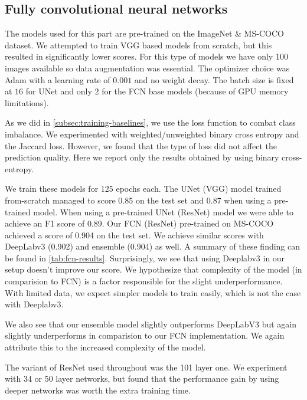 \subsection{Fully convolutional neural networks} \label{subsec:training-fcn}
The models used for this part are pre-trained on the ImageNet \& MS-COCO dataset. We attempted to train VGG based models from scratch, but this resulted in significantly lower scores. For this type of models we have only 100 images available so data augmentation was essential. The optimizer choice was Adam with a learning rate of $0.001$ and no weight decay. The batch size is fixed at $16$ for UNet and only $2$ for the FCN base models (because of GPU memory limitations).

As we did in \autoref{subsec:training-baselines}, we use the loss function to combat class imbalance. We experimented with weighted/unweighted binary cross entropy and the Jaccard loss. However, we found that the type of loss did not affect the prediction quality. Here we report only the results obtained by using binary cross-entropy.

We train these models for 125 epochs each. The UNet (VGG) model trained from-scratch managed to score 0.85 on the test set and 0.87 when using a pre-trained model. When using a pre-trained UNet (ResNet) model we were able to achieve an F1 score of 0.89. Our FCN (ResNet) pre-trained on MS-COCO achieved a score of 0.904 on the test set. We achieve similar scores with DeepLabv3 (0.902) and ensemble (0.904) as well. A summary of these finding can be found in \autoref{tab:fcn-results}.
Surprisingly, we see that using Deeplabv3 in our setup doesn't improve our score. We hypothesize that complexity of the model (in comparision to FCN) is a factor responsible for the slight underperformance. With limited data, we expect simpler models to train easily, which is not the case with Deeplabv3. 

We also see that our ensemble model slightly outperforms DeepLabV3 but again slightly underperforms in comparision to our FCN implementation. We again attribute this to the increased complexity of the model.

The variant of ResNet used throughout was the 101 layer one. We experiment with  34 or 50 layer networks, but found that the performance gain by using deeper networks was worth the extra training time.


